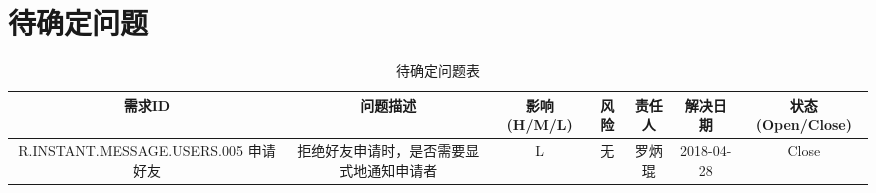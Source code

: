 \chapter{待确定问题}
\begin{table}[htbp]
\centering
\caption{待确定问题表} \label{tab:tbd_problems}
\begin{tabular}{|c|c|c|c|c|c|c|}
    \hline
    需求ID & 问题描述 & 影响(H/M/L) & 风险 & 责任人 & 解决日期 & 状态(Open/Close) \\
    \hline
    R.INSTANT.MESSAGE.USERS.005 申请好友 & 拒绝好友申请时，是否需要显式地通知申请者 & L & 无 & 罗炳琨 & 2018-04-28 & Close\\
    \hline
\end{tabular}
\end{table}